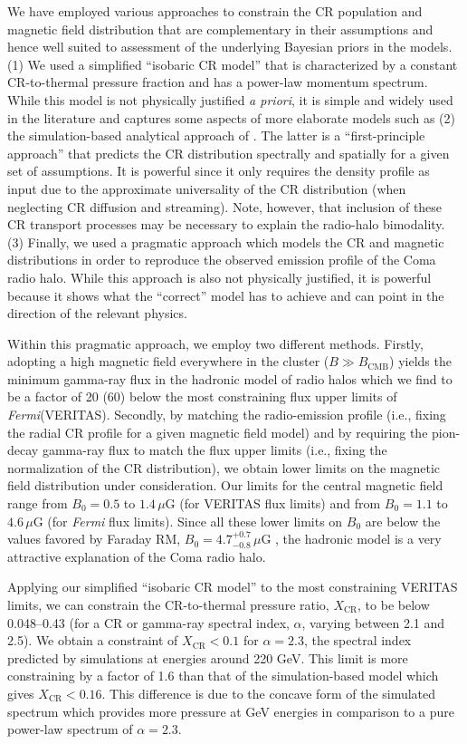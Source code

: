 \documentclass[12pt,manuscript]{aastex}
\def\Fermi{{\em Fermi}\xspace}
\newcommand{\rmn}{\mathrm}
\newcommand{\CR}{\mathrm{CR}}
\begin{document}
We have employed various approaches to constrain the CR population and magnetic field distribution
that are complementary in their assumptions and hence well suited to assessment of the underlying
Bayesian priors in the models. (1) We used a simplified ``isobaric CR model'' that is characterized
by a constant CR-to-thermal pressure fraction and has a power-law momentum spectrum. While this
model is not physically justified {\em a priori}, it is simple and widely used in the literature and
captures some aspects of more elaborate models such as (2) the simulation-based analytical approach
of \citet{article:PinzkePfrommer:2010}. The latter is a ``first-principle approach'' that predicts
the CR distribution spectrally and spatially for a given set of assumptions.
It is powerful since it only requires the density profile as input due to the
approximate universality of the CR distribution (when neglecting CR diffusion and streaming). Note,
however, that inclusion of these CR transport processes may be necessary to explain the radio-halo
bimodality. (3) Finally, we used a pragmatic approach which models the CR and magnetic distributions
in order to reproduce the observed emission profile of the Coma radio halo. While this approach is
also not physically justified, it is powerful because it shows what the ``correct'' model has to
achieve and can point in the direction of the relevant physics.

Within this pragmatic approach, we employ two different methods. Firstly, adopting a high magnetic
field everywhere in the cluster ($B\gg B_\rmn{CMB}$) yields the minimum gamma-ray flux in the
hadronic model of radio halos which we find to be a factor of 20 (60) below the most constraining
flux upper limits of \Fermi (VERITAS). Secondly, by matching the radio-emission profile (i.e.,
fixing the radial CR profile for a given magnetic field model) and by requiring the pion-decay
gamma-ray flux to match the flux upper limits (i.e., fixing the normalization of the CR
distribution), we obtain lower limits on the magnetic field distribution under consideration. Our
limits for the central magnetic field range from $B_{0} = 0.5$ to $1.4\,\mu$G (for VERITAS  flux
limits) and from $B_{0} = 1.1$ to $4.6\,\mu$G (for \Fermi flux limits). Since all these lower
limits on $B_0$ are below the values favored by Faraday RM, $B_{0} = 4.7^{+0.7}_{-0.8}\,\mu$G
\citep{article:Bonafede_etal:2010}, the hadronic model is a very attractive explanation of the Coma
radio halo.

Applying our simplified ``isobaric CR model'' to the most constraining VERITAS limits, we can
constrain the CR-to-thermal pressure ratio, $X_\CR$, to be below 0.048--0.43 (for a CR or
gamma-ray spectral index, $\alpha$, varying between 2.1 and 2.5). We obtain a constraint of
$X_\CR<0.1$ for $\alpha=2.3$, the spectral index predicted by simulations at energies around 220
GeV. This limit is
more constraining by a factor of 1.6 than that of the simulation-based model which gives
$X_\CR<0.16$. This difference is due to the concave form of the simulated spectrum which provides
more pressure at GeV energies in comparison to a pure power-law spectrum of $\alpha=2.3$.
\end{document}
